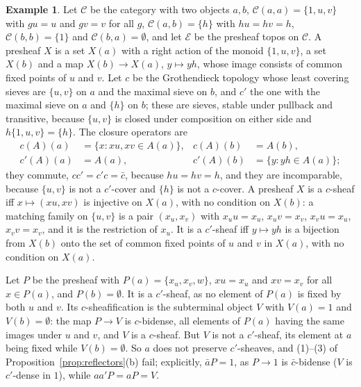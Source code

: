 \documentclass[11pt]{amsart}
\theoremstyle{definition}
\newtheorem{ex}[thm]{Example}
\newcommand{\cC}{\mathcal C}
\newcommand{\cE}{\mathcal E}
\begin{document}
\begin{ex}\label{ex:t5}
Let $\cC$ be the category with two objects $a,b$, $\cC(a,a)=\{1,u,v\}$
with $gu=u$ and $gv=v$ for all $g$, $\cC(a,b)=\{h\}$ with $hu=hv=h$,
$\cC(b,b)=\{1\}$ and $\cC(b,a)=\emptyset$, and let $\cE$ be the presheaf
topos on $\cC$. A presheaf $X$ is a set $X(a)$ with a right action of the
monoid $\{1,u,v\}$, a set $X(b)$ and a map $X(b)\to X(a)$, $y\mapsto yh$,
whose image consists of common fixed points of $u$ and $v$. Let $c$ be the
Grothendieck topology whose least covering sieves are $\{u,v\}$ on $a$ and
the maximal sieve on $b$, and $c'$ the one with the maximal sieve on $a$
and $\{h\}$ on $b$; these are sieves, stable under pullback and
transitive, because $\{u,v\}$ is closed under composition on either side
and $h\{1,u,v\}=\{h\}$. The closure operators are
\begin{align*}
c(A)(a)&=\{x:xu,xv\in A(a)\},& c(A)(b)&=A(b),\\
c'(A)(a)&=A(a),& c'(A)(b)&=\{y:yh\in A(a)\};
\end{align*}
they commute, $cc'=c'c=\bar c$, because $hu=hv=h$, and they are
incomparable, because $\{u,v\}$ is not a $c'$-cover and $\{h\}$ is not a
$c$-cover. A presheaf $X$ is a $c$-sheaf iff $x\mapsto(xu,xv)$ is
injective on $X(a)$, with no condition on $X(b)$: a matching family on
$\{u,v\}$ is a pair $(x_u,x_v)$ with $x_uu=x_u$, $x_uv=x_v$, $x_vu=x_u$,
$x_vv=x_v$, and it is the restriction of $x_u$. It is a $c'$-sheaf iff
$y\mapsto yh$ is a bijection from $X(b)$ onto the set of common fixed
points of $u$ and $v$ in $X(a)$, with no condition on $X(a)$.

Let $P$ be the presheaf with $P(a)=\{x_u,x_v,w\}$, $xu=x_u$ and $xv=x_v$
for all $x\in P(a)$, and $P(b)=\emptyset$. It is a $c'$-sheaf, as no
element of $P(a)$ is fixed by both $u$ and $v$. Its $c$-sheafification is
the subterminal object $V$ with $V(a)=1$ and $V(b)=\emptyset$: the map
$P\to V$ is $c$-bidense, all elements of $P(a)$ having the same images
under $u$ and $v$, and $V$ is a $c$-sheaf. But $V$ is not a $c'$-sheaf,
its element at $a$ being fixed while $V(b)=\emptyset$. So $a$ does not
preserve $c'$-sheaves, and (1)--(3) of Proposition~\ref{prop:reflectors}(b)
fail; explicitly, $\bar aP=1$, as $P\to1$ is $\bar c$-bidense ($V$ is
$c'$-dense in $1$), while $aa'P=aP=V$.


\end{ex}
\end{document}
